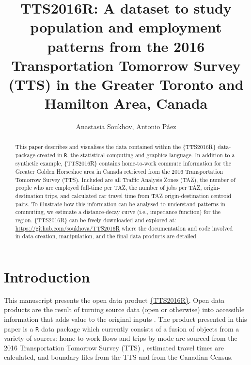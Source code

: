 \documentclass[Royal,times,sageh]{sagej}
\begin{document}

\title{TTS2016R: A dataset to study population and employment patterns
from the 2016 Transportation Tomorrow Survey (TTS) in the Greater
Toronto and Hamilton Area, Canada}

\runninghead{}

\author{Anastasia Soukhov\affilnum{}, Antonio Páez\affilnum{}}

\affiliation{\affilnum{}{}}



\begin{abstract}
This paper describes and visualises the data contained within the
\{TTS2016R\} data-package created in \texttt{R}, the statistical
computing and graphics language. In addition to a synthetic example,
\{TTS2016R\} contains home-to-work commute information for the Greater
Golden Horseshoe area in Canada retrieved from the 2016 Transportation
Tomorrow Survey (TTS). Included are all Traffic Analysis Zones (TAZ),
the number of people who are employed full-time per TAZ, the number of
jobs per TAZ, origin-destination trips, and calculated car travel time
from TAZ origin-destination centroid pairs. To illustrate how this
information can be analysed to understand patterns in commuting, we
estimate a distance-decay curve (i.e., impedance function) for the
region. \{TTS2016R\} can be freely downloaded and explored at:
\url{https://github.com/soukhova/TTS2016R} where the documentation and
code involved in data creation, manipulation, and the final data
products are detailed.
\end{abstract}


\maketitle

\hypertarget{introduction}{%
\section{Introduction}\label{introduction}}

This manuscript presents the open data product
\href{https://github.com/soukhova/TTS2016R}{\{TTS2016R\}}. Open data
products are the result of turning source data (open or otherwise) into
accessible information that adds value to the original inputs
\citep[see][]{Arribas2021open}. The product presented in this paper is a
\texttt{R} data package which currently consists of a fusion of objects
from a variety of sources: home-to-work flows and trips by mode are
sourced from the 2016 Transportation Tomorrow Survey (TTS)
\citep{data_management_group_tts_2018}, estimated travel times are
calculated, and boundary files from the TTS and from the Canadian
Census.
\end{document}
